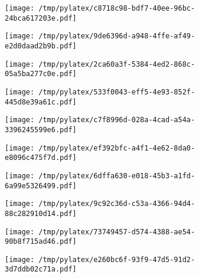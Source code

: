 \documentclass{article}
\begin{document}
\begin{figure}[htbp]
\begin{subfigure}[b]{.3\linewidth}
\texttt{[image: /tmp/pylatex/c8718c98-bdf7-40ee-96bc-24bca617203e.pdf]}
\end{subfigure}
\begin{subfigure}[b]{.3\linewidth}
\texttt{[image: /tmp/pylatex/9de6396d-a948-4ffe-af49-e2d0daad2b9b.pdf]}
\end{subfigure}
\begin{subfigure}[b]{.3\linewidth}
\texttt{[image: /tmp/pylatex/2ca60a3f-5384-4ed2-868c-05a5ba277c0e.pdf]}
\end{subfigure}
\begin{subfigure}[b]{.3\linewidth}
\texttt{[image: /tmp/pylatex/533f0043-eff5-4e93-852f-445d8e39a61c.pdf]}
\end{subfigure}
\begin{subfigure}[b]{.3\linewidth}
\texttt{[image: /tmp/pylatex/c7f8996d-028a-4cad-a54a-3396245599e6.pdf]}
\end{subfigure}
\begin{subfigure}[b]{.3\linewidth}
\texttt{[image: /tmp/pylatex/ef392bfc-a4f1-4e62-8da0-e8096c475f7d.pdf]}
\end{subfigure}
\begin{subfigure}[b]{.3\linewidth}
\texttt{[image: /tmp/pylatex/6dffa630-e018-45b3-a1fd-6a99e5326499.pdf]}
\end{subfigure}
\begin{subfigure}[b]{.3\linewidth}
\texttt{[image: /tmp/pylatex/9c92c36d-c53a-4366-94d4-88c282910d14.pdf]}
\end{subfigure}
\begin{subfigure}[b]{.3\linewidth}
\texttt{[image: /tmp/pylatex/73749457-d574-4388-ae54-90b8f715ad46.pdf]}
\end{subfigure}
\begin{subfigure}[b]{.3\linewidth}
\texttt{[image: /tmp/pylatex/e260bc6f-93f9-47d5-91d2-3d7ddb02c71a.pdf]}
\end{subfigure}
\end{figure}
\end{document}
